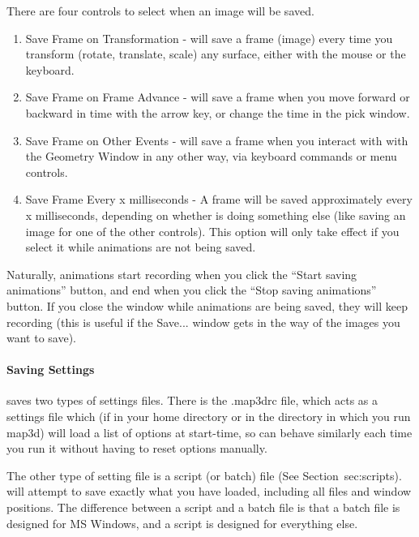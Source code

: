 \medskip
There are four controls to select when an image will be saved.  
%
\begin{enumerate}
  \item Save Frame on Transformation - will save a frame (image) every
        time you transform (rotate, translate, scale) any surface, either 
        with the mouse or the keyboard.
  \item Save Frame on Frame Advance - will save a frame when you move 
        forward or backward in time with the arrow key, or change the time
        in the pick window.
  \item Save Frame on Other Events - will save a frame when you interact with
        with the Geometry Window in any other way, via keyboard commands or 
        menu controls.
  \item Save Frame Every x milliseconds - A frame will be saved approximately
        every x milliseconds, depending on whether \map{} is doing something 
        else (like saving an image for one of the other controls).  This option
        will only take effect if you select it while animations are not being
        saved.  
\end{enumerate}
\medskip

Naturally, animations start recording when you click the ``Start saving 
animations'' button, and end when you click the ``Stop saving animations'' 
button.  If you close the window while animations are being saved, they
will keep recording (this is useful if the Save... window gets in the way
of the images you want to save).


\paragraph{Saving Settings}
\label{sec:savesettings}

\map{} saves two types of settings files.  There is the .map3drc file,
which acts as a settings file which (if in your home directory or in the
directory in which you run map3d) will load a list of options at
start-time, so \map{} can behave similarly each time you run it without
having to reset options manually.

The other type of setting file is a script (or batch) file (See
Section~sec:scripts).  \map{} will attempt to save exactly what you have
loaded, including all files and window positions.  The difference between a
script and a batch file is that a batch file is designed for MS Windows,
and a script is designed for everything else.


